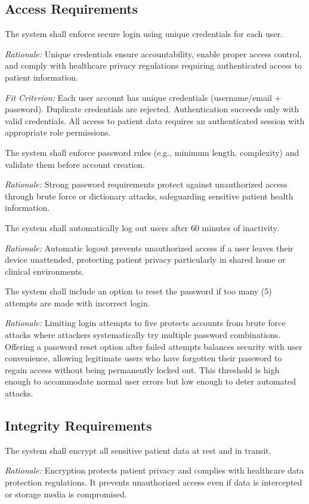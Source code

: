 \documentclass[12pt]{article}
\newcommand{\rationale}[1]{\par\emph{Rationale:} #1}
\newcommand{\fitcrit}[1]{\par\emph{Fit Criterion:} #1}
\begin{document}
\subsection{Access Requirements}
\begin{reqlist}
	\item[SR-AR 1.] The system shall enforce secure login using unique credentials for each user.
	\rationale{Unique credentials ensure accountability, enable proper access control, and comply with healthcare privacy regulations requiring authenticated access to patient information.}
	\fitcrit{Each user account has unique credentials (username/email + password). Duplicate credentials are rejected. Authentication succeeds only with valid credentials. All access to patient data requires an authenticated session with appropriate role permissions.}
	
	\item[SR-AR 2.] The system shall enforce password rules (e.g., minimum length, complexity) and validate them before account creation.
	\rationale{Strong password requirements protect against unauthorized access through brute force or dictionary attacks, safeguarding sensitive patient health information.}
	
	\item[SR-AR 3.] The system shall automatically log out users after 60 minutes of inactivity.
	\rationale{Automatic logout prevents unauthorized access if a user leaves their device unattended, protecting patient privacy particularly in shared home or clinical environments.}
	
	
	\item[SR3.] The system shall include an option to reset the password if too many (5) attempts are made with incorrect login.
	\rationale{Limiting login attempts to five protects accounts from brute force attacks where attackers systematically try multiple password combinations. Offering a password reset option after failed attempts balances security with user convenience, allowing legitimate users who have forgotten their password to regain access without being permanently locked out. This threshold is high enough to accommodate normal user errors but low enough to deter automated attacks.}
\end{reqlist}

\subsection{Integrity Requirements}
\begin{reqlist}
	\item[SR-IR 1.] The system shall encrypt all sensitive patient data at rest and in transit.
	\rationale{Encryption protects patient privacy and complies with healthcare data protection regulations. It prevents unauthorized access even if data is intercepted or storage media is compromised.}
\end{reqlist}
\end{document}
